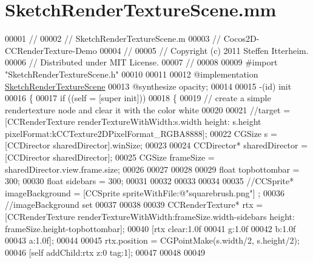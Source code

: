 \hypertarget{_sketch_render_texture_scene_8mm}{\section{Sketch\-Render\-Texture\-Scene.\-mm}
\label{d3/d58/_sketch_render_texture_scene_8mm}
}

\begin{DoxyCode}
00001 \textcolor{comment}{//}
00002 \textcolor{comment}{//  SketchRenderTextureScene.m}
00003 \textcolor{comment}{//  Cocos2D-CCRenderTexture-Demo}
00004 \textcolor{comment}{//}
00005 \textcolor{comment}{//  Copyright (c) 2011 Steffen Itterheim.}
00006 \textcolor{comment}{//  Distributed under MIT License.}
00007 \textcolor{comment}{//}
00008 
00009 \textcolor{preprocessor}{#import "SketchRenderTextureScene.h"}
00010 
00011 
00012 \textcolor{keyword}{@implementation }\hyperlink{interface_sketch_render_texture_scene}{SketchRenderTextureScene}
00013 \textcolor{keyword}{@synthesize} opacity;
00014 
00015 -(id) init
00016 \{
00017     \textcolor{keywordflow}{if} ((\textcolor{keyword}{self} = [super init])) 
00018     \{
00019         \textcolor{comment}{// create a simple rendertexture node and clear it with the color white}
00020         
00021         \textcolor{comment}{//target = [CCRenderTexture renderTextureWithWidth:s.width height: s.height
       pixelFormat:kCCTexture2DPixelFormat\_RGBA8888];}
00022         CGSize s = [CCDirector sharedDirector].winSize;
00023 
00024         CCDirector* sharedDirector =[CCDirector sharedDirector];
00025         CGSize frameSize = sharedDirector.view.frame.size;
00026         
00027         
00028         
00029         \textcolor{keywordtype}{float} topbottombar = 300;
00030         \textcolor{keywordtype}{float} sidebars = 300;
00031 
00032         
00033         
00034         
00035         \textcolor{comment}{//CCSprite* imageBackground = [CCSprite spriteWithFile:@"squarebrush.png"] ;}
00036         \textcolor{comment}{//imageBackground set}
00037 
00038         
00039         CCRenderTexture* rtx = [CCRenderTexture renderTextureWithWidth:frameSize.width-sidebars height: 
      frameSize.height-topbottombar];
00040         [rtx clear:1.0f 
00041                  g:1.0f
00042                  b:1.0f
00043                  a:1.0f];
00044         
00045         rtx.position = CGPointMake(s.width/2, s.height/2);
00046         [\textcolor{keyword}{self} addChild:rtx z:0 tag:1];
00047         
00048         
00049         

\end{DoxyCode}

